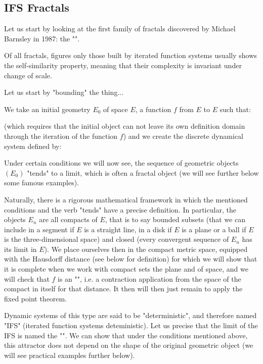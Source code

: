 	\subsection{IFS Fractals}
	Let us start by looking at the first family of fractals discovered by Michael Barnsley in 1987: the "".
	
	Of all fractals, figures only those built by iterated function systems usually shows the self-similarity property, meaning that their complexity is invariant under change of scale.
	
	Let us start by "bounding" the thing...
	
	We take an initial geometry $E_0$ of space $E$, a function $f$ from $E$ to $E$ such that:
	
	(which requires that the initial object can not leave its own definition domain through the iteration of the function $f$) and we create the discrete dynamical system defined by:
	
	Under certain conditions we will now see, the sequence of geometric objects $(E_0)$ "tends" to a limit, which is often a fractal object (we will see further below some famous examples).
	
	Naturally, there is a rigorous mathematical framework in which the mentioned conditions and the verb "tends" have a precise definition. In particular, the objects $E_n$ are all compacts of $E$, that is to say bounded subsets (that we can include in a segment if $E$ is a straight line, in a disk if $E$ is a plane or a ball if $E$ is the three-dimensional space) and closed (every convergent sequence of $E_n$ has its limit in $E$). We place ourselves then in the compact metric space, equipped with the Hausdorff distance (see below for definition) for which we will show that it is complete when we work with compact sets the plane and  of space, and we will check that $f$ is an "", i.e. a contraction application from the space of the compact in itself for that distance. It then will then just remain to apply the fixed point theorem.
	
	Dynamic systems of this type are said to be "deterministic", and therefore named "IFS" (iterated function systems deteministic). Let us precise that the limit of the IFS is named the "". We can show that under the conditions mentioned above, this attractor does not depend on the shape of the original geometric object (we will see practical examples further below).
	
